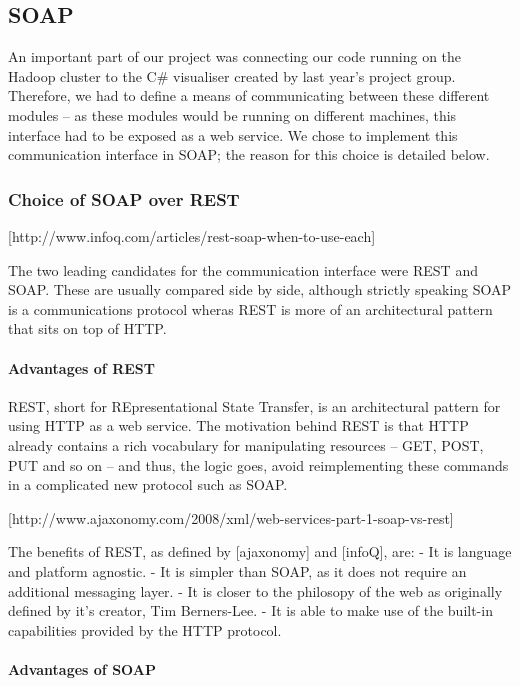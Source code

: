 \subsection{SOAP}

An important part of our project was connecting our code running on the Hadoop cluster to the C\# visualiser created by last year's project group. Therefore, we had to define a means of communicating between these different modules -- as these modules would be running on different machines, this interface had to be exposed as a web service. We chose to implement this communication interface in SOAP; the reason for this choice is detailed below.

\subsubsection{Choice of SOAP over REST}

[http://www.infoq.com/articles/rest-soap-when-to-use-each]

The two leading candidates for the communication interface were REST and SOAP. These are usually compared side by side, although strictly speaking SOAP is a communications protocol wheras REST is more of an architectural pattern that sits on top of HTTP.

\paragraph{Advantages of REST}

REST, short for REpresentational State Transfer, is an architectural pattern for using HTTP as a web service. The motivation behind REST is that HTTP already contains a rich vocabulary for manipulating resources -- GET, POST, PUT and so on -- and thus, the logic goes, avoid reimplementing these commands in a complicated new protocol such as SOAP.

[http://www.ajaxonomy.com/2008/xml/web-services-part-1-soap-vs-rest]

The benefits of REST, as defined by [ajaxonomy] and [infoQ], are:
- It is language and platform agnostic.
- It is simpler than SOAP, as it does not require an additional messaging layer.
- It is closer to the philosopy of the web as originally defined by it's creator, Tim Berners-Lee.
- It is able to make use of the built-in capabilities provided by the HTTP protocol.

\paragraph{Advantages of SOAP}

